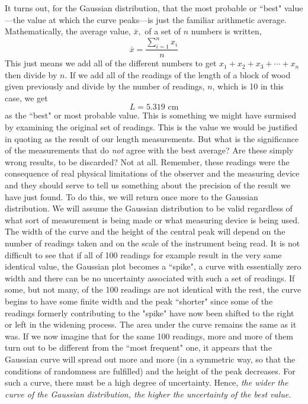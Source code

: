 \documentclass[main.tex]{subfiles}
\begin{document}
\FloatBarrier
It turns out, for the Gaussian distribution, that the most probable or ``best" value---the value at which the curve peaks---is just the familiar arithmetic average.  Mathematically, the average value, $\bar{x},$ of a set of $n$ numbers is written,
\[
\bar{x}=\frac{\sum_{i=1}^{n}x_i}{n}
\]
This just means we add all of the different numbers to get  $x_1 + x_2 + x_3 +\dotsb+ x_n$ then divide by $n.$  If we add all of the readings of the length of a block of wood given previously and divide by the number of readings, $n$, which is 10 in this case, we get
\[
L=5.319\text{ cm}
\]
as the ``best" or most probable value.  This is something we might have surmised by examining the original set of readings.  This is the value we would be justified in quoting as the result of our length measurements.  But what is the significance of the measurements that do \emph{not} agree with the best average?  Are these simply wrong results, to be discarded?  Not at all.  Remember, these readings were the consequence of real physical limitations of the observer and the measuring device and they should serve to tell us something about the precision of the result we have just found.  To do this, we will return once more to the Gaussian distribution.  We will assume the Gaussian distribution to be valid regardless of what sort of measurement is being made or what measuring device is being used.  The width of the curve and the height of the central peak will depend on the number of readings taken and on the scale of the instrument being read.  It is not difficult to see that if all of 100 readings for example result in the very same identical value, the Gaussian plot becomes a ``spike", a curve with essentially zero width and there can be no uncertainty associated with such a set of readings.  If some, but not many, of the 100 readings are not identical with the rest, the curve begins to have some finite width and the peak ``shorter" since some of the readings formerly contributing to the "spike" have now been shifted to the right or left in the widening process.  The area under the curve remains the same as it was.  If we now imagine that for the same 100 readings, more and more of them turn out to be different from the ``most frequent" one, it appears that the Gaussian curve will spread out more and more (in a symmetric way, so that the conditions of randomness are fulfilled) and the height of the peak decreases.  For such a curve, there must be a high degree of uncertainty.  Hence, \emph{the wider the curve of the Gaussian distribution, the higher the uncertainty of the best value.}
\end{document}
